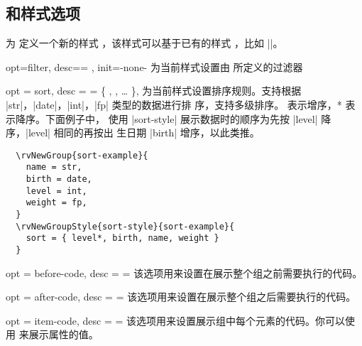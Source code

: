 \documentclass[full]{l3doc}
\begin{document}
\begin{documentation}
\subsection{ 和样式选项}

\begin{function}{\rvNewGroupStyle}
  \begin{syntax}
        
  \end{syntax}

  为  定义一个新的样式 ，该样式可以基于已有的样式
  ，比如 ||。
\end{function}

\bigskip

\begin{option}{opt=filter, desc={= }, init=-none-}
  为当前样式设置由  所定义的过滤器
\end{option}

\begin{option}{
  opt = sort,
  desc = {= \{ , , \ldots{} \}},
}
  为当前样式设置排序规则。支持根据 |str|，|date|，|int|，|fp| 类型的数据进行排
  序，支持多级排序。 表示增序，* 表示降序。下面例子中，
  使用 |sort-style| 展示数据时的顺序为先按 |level| 降序，|level| 相同的再按出
  生日期 |birth| 增序，以此类推。
\end{option}

\begin{verbatim}
  \rvNewGroup{sort-example}{
    name = str,
    birth = date,
    level = int,
    weight = fp,
  }
  \rvNewGroupStyle{sort-style}{sort-example}{
    sort = { level*, birth, name, weight }
  }
\end{verbatim}

\begin{option}{
  opt = before-code,
  desc = {= }
}
  该选项用来设置在展示整个组之前需要执行的代码。
\end{option}

\begin{option}{
  opt = after-code,
  desc = {= }
}
  该选项用来设置在展示整个组之后需要执行的代码。
\end{option}

\begin{option}{
  opt = item-code,
  desc = {= }
}
  该选项用来设置展示组中每个元素的代码。你可以使用  来展示属性的值。
\end{option}


\end{documentation}
\end{document}
